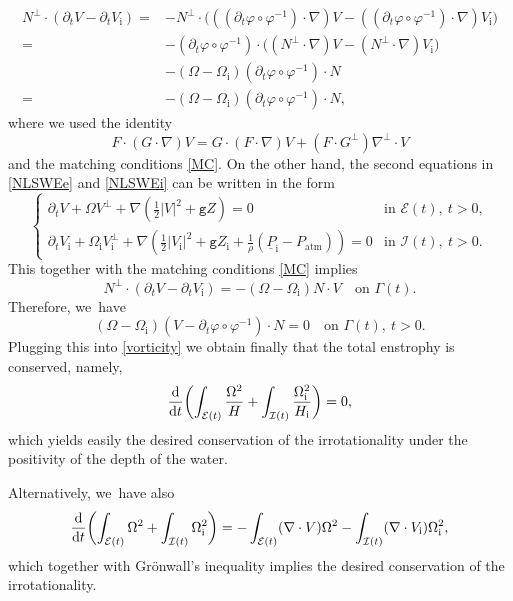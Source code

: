 \documentclass[10pt]{amsart}
\newcommand{\gr}{{\mathtt g}}
\newcommand{\dt}{\partial_t}
\newcommand{\cI}{{\mathcal I}}
\newcommand{\cE}{{\mathcal E}}
\newcommand{\ul}[1]{\underline{#1}}
\newcommand{\itGamma}{\mathit{\Gamma}}
\theoremstyle{definition}
\begin{document}
\begin{align*}
N^\perp\cdot(\dt V - \dt V_\mathrm{i})
=& -N^\perp\cdot\bigl(((\dt\varphi \circ \varphi^{-1})\cdot\nabla)V
- ((\dt\varphi \circ \varphi^{-1})\cdot\nabla)V_\mathrm{i} \bigr) \\
=& -(\dt\varphi \circ \varphi^{-1})\cdot\bigl((N^\perp\cdot\nabla)V - (N^\perp\cdot\nabla)V_\mathrm{i} \bigr)\\
& - (\Omega - \Omega_\mathrm{i})(\dt\varphi \circ \varphi^{-1}) \cdot N \\
=& - (\Omega - \Omega_\mathrm{i})(\dt\varphi \circ \varphi^{-1}) \cdot N,
\end{align*}
where we used the identity
\begin{equation}\label{F1}
F \cdot (G\cdot\nabla)V = G \cdot (F\cdot\nabla)V + (F\cdot G^\perp)\nabla^\perp \cdot V
\end{equation}
and the matching conditions \eqref{MC}.
On the other hand, the second equations in \eqref{NLSWEe} and \eqref{NLSWEi} can be written in the form
\[
\begin{cases}
\dt V + \Omega V^\perp + \nabla(\frac12|V|^2 + \gr Z) = 0 & \text{in } \cE(t), \ t>0, \\
\dt V_\mathrm{i} + \Omega_\mathrm{i} V_\mathrm{i}^\perp
+ \nabla(\frac12|V_\mathrm{i}|^2 + \gr Z_\mathrm{i} + \frac{1}{\rho}(\ul{P}_\mathrm{i}-P_\mathrm{atm})) = 0 & \text{in } \cI(t), \ t>0.
\end{cases}
\]
This together with the matching conditions \eqref{MC} implies
\[
N^\perp\cdot(\dt V - \dt V_\mathrm{i})=-(\Omega-\Omega_\mathrm{i})N\cdot V\quad\text{on }\itGamma(t).
\]
Therefore, we~have
\[
(\Omega - \Omega_\mathrm{i})(V - \dt\varphi \circ \varphi^{-1})\cdot N = 0 \quad\text{on } \itGamma(t), \ t>0.
\]
Plugging this into \eqref{vorticity} we obtain finally that the total enstrophy is conserved, namely,
\[
\frac{\rm d}{{\rm d}t}\biggl(\int_{\cE(t)}\frac{\Omega^2}{H} + \int_{\cI(t)}\frac{\Omega_\mathrm{i}^2}{H_\mathrm{i}} \biggr) = 0,
\]
which yields easily the desired conservation of the irrotationality under the positivity of the depth of the water.

Alternatively, we~have also
\[
\frac{\rm d}{{\rm d}t}\biggl(\int_{\cE(t)}\Omega^2 + \int_{\cI(t)}\Omega_\mathrm{i}^2\biggr)
= - \int_{\cE(t)}(\nabla\cdot V)\Omega^2 - \int_{\cI(t)}(\nabla\cdot V_\mathrm{i})\Omega_\mathrm{i}^2,
\]
which together with Grönwall's inequality implies the desired conservation of the irrotationality.
\end{document}
